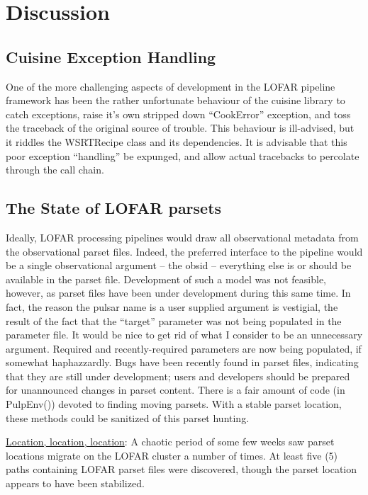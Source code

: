 \documentclass[a4paper,10pt,bibtotoc]{scrartcl}
\begin{document}

\section{Discussion}
\label{sec:discussion}
\subsection{Cuisine Exception Handling}
One of the more challenging aspects of development in the LOFAR
pipeline framework has been the rather unfortunate behaviour of the
cuisine library to catch exceptions, raise it's own stripped down
``CookError'' exception, and toss the traceback of the original source
of trouble.  This behaviour is ill-advised, but it riddles the
WSRTRecipe class and its dependencies.  It is advisable that this poor
exception ``handling'' be expunged, and allow actual tracebacks to
percolate through the call chain.

\subsection{The State of LOFAR parsets}
Ideally, LOFAR processing pipelines would draw all observational
metadata from the observational parset files.  Indeed, the preferred
interface to the pipeline would be a single observational argument --
the obsid -- everything else is or should be available in the parset
file. Development of such a model was not feasible, however, as parset
files have been under development during this same time.  In fact, the
reason the pulsar name is a user supplied argument is vestigial, the
result of the fact that the ``target'' parameter was not being
populated in the parameter file. It would be nice to get rid of what I
consider to be an unnecessary argument. Required and recently-required
parameters are now being populated, if somewhat haphazzardly.  Bugs
have been recently found in parset files, indicating that they are
still under development; users and developers should be prepared for
unannounced changes in parset content.  There is a fair amount of code
(in PulpEnv()) devoted to finding moving parsets.  With a stable
parset location, these methods could be sanitized of this parset
hunting.

\underline{Location, location, location}: A chaotic period of some few
weeks saw parset locations migrate on the LOFAR cluster a number of
times. At least five (5) paths containing LOFAR parset files were
discovered, though the parset location appears to have been stabilized.
\end{document}
